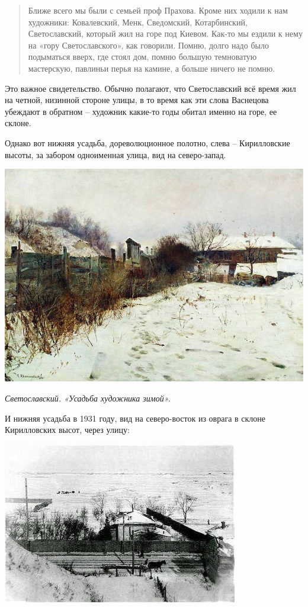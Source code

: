 \begin{quotation}
Ближе всего мы были с семьей проф Прахова. Кроме них ходили к нам художники: Ковалевский, Менк, Сведомский, Котарбинский, Светославский, который жил на горе под Киевом. Как-то мы ездили к нему на «гору Светославского», как говорили. Помню, долго надо было подыматься вверх, где стоял дом, помню большую темноватую мастерскую, павлиньи перья на камине, а больше ничего не помню.
\end{quotation}

Это важное свидетельство. Обычно полагают, что Светославский всё время жил на четной, низинной стороне улицы, в то время как эти слова Васнецова убеждают в обратном – художник какие-то годы обитал именно на горе, ее склоне.

Однако вот нижняя усадьба, дореволюционное полотно, слева – Кирилловские высоты, за забором одноименная улица, вид на северо-запад.

\begin{center}
\includegraphics[width=0.95\linewidth]{chast-kirvys/svetosl/sveto-usadba-hudojnika-zimoy.jpg}

\textit{Светославский. «Усадьба художника зимой».}
\end{center}

И нижняя усадьба в 1931 году, вид на северо-восток из оврага в склоне Кирилловских высот, через улицу: 

\begin{center}
\includegraphics[width=0.95\linewidth]{chast-kirvys/svetosl/1931.jpg}
\end{center}

